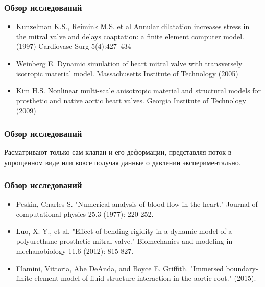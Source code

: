 \documentclass[14pt]{beamer}
\begin{document}
\begin{frame}
\frametitle{Обзор исследований}
    \begin{itemize}
        \item[\MVRightarrow] Kunzelman K.S., Reimink M.S. et al  Annular dilatation increases stress in the mitral valve and delays coaptation: a finite element computer model. (1997) Cardiovasc Surg 5(4):427–434
        \item[\MVRightarrow] Weinberg E. Dynamic simulation of heart mitral valve with transversely isotropic material model. Massachusetts Institute of Technology (2005)
        \item[\MVRightarrow] Kim H.S. Nonlinear multi-scale anisotropic material and structural models for prosthetic and native aortic heart valves. Georgia Institute of Technology (2009)
    \end{itemize}
\end{frame}

\begin{frame}
\frametitle{Обзор исследований}
    Расматривают только сам клапан и его деформации, представляя поток в упрощенном виде или
    вовсе получая данные о давлении экспериментально.
\end{frame}

\begin{frame}
\frametitle{Обзор исследований}
    \begin{itemize}
        \item[\MVRightarrow] Peskin, Charles S. "Numerical analysis of blood flow in the heart." Journal of computational physics 25.3 (1977): 220-252.
        \item[\MVRightarrow] Luo, X. Y., et al. "Effect of bending rigidity in a dynamic model of a polyurethane prosthetic mitral valve." Biomechanics and modeling in mechanobiology 11.6 (2012): 815-827.
        \item[\MVRightarrow] Flamini, Vittoria, Abe DeAnda, and Boyce E. Griffith. "Immersed boundary-finite element model of fluid-structure interaction in the aortic root." (2015).
    \end{itemize}
\end{frame}
\end{document}
